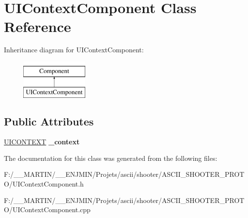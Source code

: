 \hypertarget{class_u_i_context_component}{}\section{U\+I\+Context\+Component Class Reference}
\label{class_u_i_context_component}
Inheritance diagram for U\+I\+Context\+Component\+:\begin{figure}[H]
\begin{center}
\leavevmode
\includegraphics[height=2.000000cm]{class_u_i_context_component}
\end{center}
\end{figure}
\subsection*{Public Attributes}
\begin{DoxyCompactItemize}
\item 
\hypertarget{class_u_i_context_component_a23c5b40f9a25eee2de63d2e7f9097ed6}{}\label{class_u_i_context_component_a23c5b40f9a25eee2de63d2e7f9097ed6} 
\hyperlink{struct_u_i_c_o_n_t_e_x_t}{U\+I\+C\+O\+N\+T\+E\+XT} {\bfseries \+\_\+context}
\end{DoxyCompactItemize}


The documentation for this class was generated from the following files\+:\begin{DoxyCompactItemize}
\item 
F\+:/\+\_\+\+\_\+\+M\+A\+R\+T\+I\+N/\+\_\+\+\_\+\+E\+N\+J\+M\+I\+N/\+Projets/ascii/shooter/\+A\+S\+C\+I\+I\+\_\+\+S\+H\+O\+O\+T\+E\+R\+\_\+\+P\+R\+O\+T\+O/U\+I\+Context\+Component.\+h\item 
F\+:/\+\_\+\+\_\+\+M\+A\+R\+T\+I\+N/\+\_\+\+\_\+\+E\+N\+J\+M\+I\+N/\+Projets/ascii/shooter/\+A\+S\+C\+I\+I\+\_\+\+S\+H\+O\+O\+T\+E\+R\+\_\+\+P\+R\+O\+T\+O/U\+I\+Context\+Component.\+cpp\end{DoxyCompactItemize}
